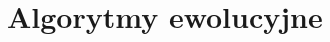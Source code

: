 \documentclass[../FM_mgr.tex]{subfiles}
\begin{document}
\chapter{Algorytmy ewolucyjne} \label{chapter:eaDesc}
\end{document}
